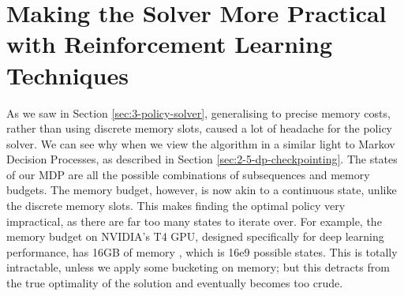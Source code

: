 \section{Making the Solver More Practical with Reinforcement Learning Techniques}

As we saw in Section \ref{sec:3-policy-solver}, generalising to precise memory costs, rather than using discrete memory slots, caused a lot of headache for the policy solver.
We can see why when we view the algorithm in a similar light to Markov Decision Processes, as described in Section \ref{sec:2-5-dp-checkpointing}.
The states of our MDP are all the possible combinations of subsequences and memory budgets.
The memory budget, however, is now akin to a continuous state, unlike the discrete memory slots.
This makes finding the optimal policy very impractical, as there are far too many states to iterate over.
For example, the memory budget on NVIDIA's T4 GPU, designed specifically for deep learning performance, has 16GB of memory \cite{Nvidia2019-T4}, which is 16e9 possible states.
This is totally intractable, unless we apply some bucketing on memory; but this detracts from the true optimality of the solution and eventually becomes too crude.

